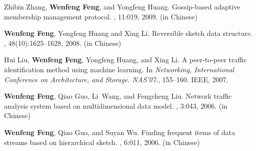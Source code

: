 \documentclass[11pt,a4paper,sans]{moderncv}        %
\begin{document}
\begin{thebibliography}{10}


Zhibin Zhang, \textbf{Wenfeng Feng}, and Yongfeng Huang.
\newblock Gossip-based adaptive membership management protocol.
, 11:019, 2009. (in Chinese)

\textbf{Wenfeng Feng}, Yongfeng Huang and Xing Li.
\newblock Reversible sketch data structure.
, 48(10):1625--1628, 2008. (in Chinese)

Hui Liu, \textbf{Wenfeng Feng}, Yongfeng Huang, and Xing Li.
\newblock A peer-to-peer traffic identification method using machine learning.
\newblock In {\em Networking, International Conference on Architecture, and Storage. NAS'07.}, 155--160. IEEE, 2007.


\textbf{Wenfeng Feng}, Qiao Guo, Li~Wang, and Fengcheng Liu.
\newblock Network traffic analysis system based on multidimensional data model.
, 3:043, 2006. (in Chinese)

\textbf{Wenfeng Feng}, Qiao Guo, and Suyan Wu.
\newblock Finding frequent items of data streams based on hierarchical sketch.
, 6:011, 2006. (in Chinese)



\end{thebibliography}
\end{document}

